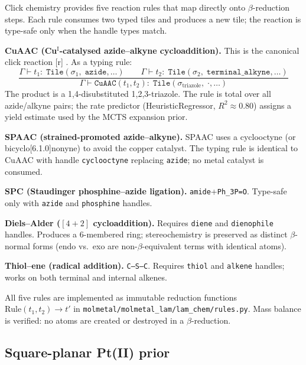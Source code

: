 \documentclass[10pt]{article}
\begin{document}
Click chemistry \cite{sharpless2001click} provides five reaction rules that map
directly onto $\beta$-reduction steps.  Each rule consumes two typed tiles and
produces a new tile; the reaction is type-safe only when the handle types match.

\medskip\noindent\textbf{CuAAC (Cu$^{\text{I}}$-catalysed azide--alkyne
cycloaddition).}  This is the canonical click reaction
[r] \;\;
.  As a typing rule:
\[
  \frac{\Gamma\vdash t_1:\;\texttt{Tile}(\sigma_1,\;\texttt{azide},\dots)\qquad
        \Gamma\vdash t_2:\;\texttt{Tile}(\sigma_2,\;\texttt{terminal\_alkyne},\dots)}
       {\Gamma\vdash \texttt{CuAAC}(t_1,t_2):
        \;\texttt{Tile}(\sigma_{\text{triazole}},\;\cdot,\dots)}
\]
The product is a 1,4-disubstituted 1,2,3-triazole.  The rule is total over
all azide/alkyne pairs; the rate predictor (HeuristicRegressor, $R^2\approx0.80$)
assigns a yield estimate used by the MCTS expansion prior.

\medskip\noindent\textbf{SPAAC (strained-promoted azide--alkyne).}
SPAAC uses a cyclooctyne (or bicyclo[6.1.0]nonyne) to avoid the copper
catalyst.  The typing rule is identical to CuAAC with handle
\texttt{cyclooctyne} replacing \texttt{azide}; no metal catalyst is consumed.

\medskip\noindent\textbf{SPC (Staudinger phosphine--azide ligation).}
 \;\to\; \texttt{amide}\;+\;\texttt{Ph_3P=O}.
Type-safe only with \texttt{azide} and \texttt{phosphine} handles.

\medskip\noindent\textbf{Diels--Alder ($[4\!+\!2]$ cycloaddition).}
Requires \texttt{diene} and \texttt{dienophile} handles.  Produces a 6-membered
ring; stereochemistry is preserved as distinct $\beta$-normal forms (endo vs.\
exo are non-$\beta$-equivalent terms with identical atoms).

\medskip\noindent\textbf{Thiol--ene (radical addition).}
 \;\; \texttt{C--S--C}.
Requires \texttt{thiol} and \texttt{alkene} handles; works on both terminal and
internal alkenes.

All five rules are implemented as immutable reduction functions
$\text{Rule}(t_1,t_2)\to t'$ in
\texttt{molmetal/molmetal\_lam/lam\_chem/rules.py}.  Mass balance is verified:
no atoms are created or destroyed in a $\beta$-reduction.

\subsection{Square-planar Pt(II) prior}
\end{document}
